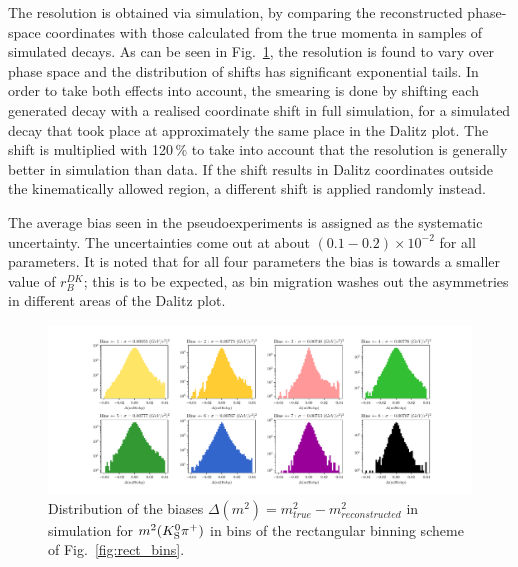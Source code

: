 
The resolution is obtained via simulation, by comparing the reconstructed phase-space coordinates with those calculated from the true momenta in samples of simulated \DtoKspipi decays. As can be seen in Fig.~\ref{fig:dalitz_coord_resolution_and_correlation}, the resolution is found to vary over phase space and the distribution of shifts has significant exponential tails. In order to take both effects into account, the smearing is done by shifting each generated decay with a realised coordinate shift in full simulation, for a simulated decay that took place at approximately the same place in the Dalitz plot. The shift is multiplied with 120\,\% to take into account that the resolution is generally better in simulation than data. If the shift results in Dalitz coordinates outside the kinematically allowed region, a different shift is applied randomly instead.

The average bias seen in the pseudoexperiments is assigned as the systematic uncertainty. The uncertainties come out at about $(0.1-0.2)\times 10^{-2}$ for all parameters. It is noted that for all four \DK parameters the bias is towards a smaller value of $r_B^{DK}$; this is to be expected, as bin migration washes out the asymmetries in different areas of the Dalitz plot. 

\begin{figure}[tb]
    \centering
    \includegraphics[width=\columnwidth]{figures/analysis/systematics/Dalitz_resolution_rect_bins.pdf}
    \caption{Distribution of the biases $\Delta (m^2) = m^2_{true} - m^2_{reconstructed}$ in simulation for $m^2({{K}^0_{\mathrm{S}}} {{\pi}^+})$ in bins of the rectangular binning scheme of Fig.~\ref{fig:rect_bins}.}
    \label{fig:dalitz_coord_resolution_and_correlation}
\end{figure}



